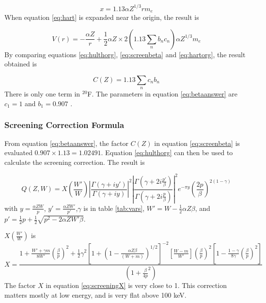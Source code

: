 \documentclass[../MaxHughesThesis.tex]{subfiles}
\begin{document}
\begin{equation}
	x = 1.13 \alpha Z^{1/3} r m_{e}
	\label{eq:screeningx}
\end{equation}
When equation \ref{eq:hart} is expanded near the origin, the result is %

\begin{equation}
	V(r) = - \frac{\alpha Z}{r} + \frac{1}{2} \alpha Z \times 2 (1.13 \sum_{n} b_{n} c_{n}) \alpha Z^{1/3} m_{e} 
	\label{eq:hartorg}
\end{equation}
By comparing equations \ref{eq:hulthorg}, \ref{eq:screenbeta} and \ref{eq:hartorg}, the result obtained is %

\begin{equation}
	C(Z) = 1.13 \sum_{n} c_{n} b_{n}
	\label{eq:betaanswer}
\end{equation} 
There is only one term in $^{20}$F. 
The parameters in equation \ref{eq:betaanswer} are $c_{1} = 1$ and $b_{1} = 0.907$ \cite{Bya56}.

\subsubsection{Screening Correction Formula}
From equation \ref{eq:betaanswer}, the factor $C(Z)$ in equation \ref{eq:screenbeta} is evaluated $0.907 \times 1.13 = 1.02491$.
Equation \ref{eq:hulthorg} can then be used to calculate the screening correction.
The result is \cite{Buh84} %

\begin{equation}
	Q(Z,W) = X(\frac{W'}{W})|\frac{\Gamma(\gamma + i y')}{\Gamma(\gamma+ i y)}|^{2}|\frac{\Gamma(\gamma + 2 i \frac{p'}{\beta})}{\Gamma(\gamma + 2 i \frac{p}{\beta})}|^{2}e^{-\pi y}(\frac{2p}{\beta})^{2(1 - \gamma)}
	\label{eq:screeningQ}
\end{equation}
with $y = \frac{\alpha Z W}{p}$, $y' = \frac{\alpha Z W'}{p'}$,$ \gamma$ is in table \ref{tab:vars}, $W' = W - \frac{1}{2}\alpha Z \beta$, and $p' = \frac{1}{2}p + \frac{1}{2}\sqrt{p^{2} - 2 \alpha Z W' \beta}$.

$X(\frac{W'}{W})$ is %
\begin{equation}
	X = \frac{1 + \frac{W' + \gamma m}{8 W'} (\frac{\beta}{p})^{2} + \frac{1}{2}\gamma^{2}[1 + (1 - \frac{\alpha Z \beta}{(W + m)})^{1/2}]^{-2} [\frac{W - m}{W'}] (\frac{\beta}{p})^{2}[1 - \frac{1 - \gamma}{8\gamma}(\frac{\beta}{p})^{2}]}{(1 + \frac{\beta}{4p}^{2})}
	\label{eq:screeningX}
\end{equation}
The factor $X$ in equation \ref{eq:screeningX} is very close to 1.
This correction matters mostly at low energy, and is very flat above 100 keV.
\end{document}
